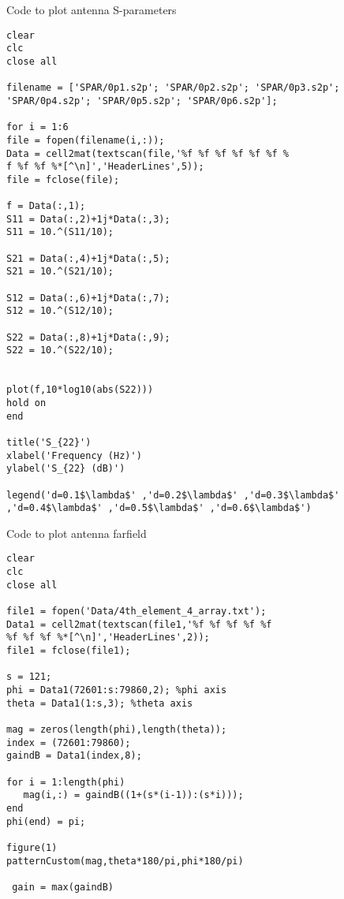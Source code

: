 Code to plot antenna S-parameters
\begin{lstlisting}[frame = single]
%% Load S-parameters for two ant
clear
clc
close all

filename = ['SPAR/0p1.s2p'; 'SPAR/0p2.s2p'; 'SPAR/0p3.s2p'; 
'SPAR/0p4.s2p'; 'SPAR/0p5.s2p'; 'SPAR/0p6.s2p'];

for i = 1:6
file = fopen(filename(i,:));
Data = cell2mat(textscan(file,'%f %f %f %f %f %f %
f %f %f %*[^\n]','HeaderLines',5));
file = fclose(file);

f = Data(:,1);
S11 = Data(:,2)+1j*Data(:,3);
S11 = 10.^(S11/10);

S21 = Data(:,4)+1j*Data(:,5);
S21 = 10.^(S21/10);

S12 = Data(:,6)+1j*Data(:,7);
S12 = 10.^(S12/10);

S22 = Data(:,8)+1j*Data(:,9);
S22 = 10.^(S22/10);


plot(f,10*log10(abs(S22)))
hold on
end

title('S_{22}')
xlabel('Frequency (Hz)')
ylabel('S_{22} (dB)')

legend('d=0.1$\lambda$' ,'d=0.2$\lambda$' ,'d=0.3$\lambda$' 
,'d=0.4$\lambda$' ,'d=0.5$\lambda$' ,'d=0.6$\lambda$')
\end{lstlisting}


Code to plot antenna farfield
\begin{lstlisting}[frame = single]
%% plot antenna farfield
clear
clc
close all

file1 = fopen('Data/4th_element_4_array.txt');
Data1 = cell2mat(textscan(file1,'%f %f %f %f %f 
%f %f %f %*[^\n]','HeaderLines',2));
file1 = fclose(file1);

s = 121;
phi = Data1(72601:s:79860,2); %phi axis
theta = Data1(1:s,3); %theta axis

mag = zeros(length(phi),length(theta));
index = (72601:79860);
gaindB = Data1(index,8);

for i = 1:length(phi)
   mag(i,:) = gaindB((1+(s*(i-1)):(s*i)));
end
phi(end) = pi;

figure(1)
patternCustom(mag,theta*180/pi,phi*180/pi)

 gain = max(gaindB)
\end{lstlisting}







